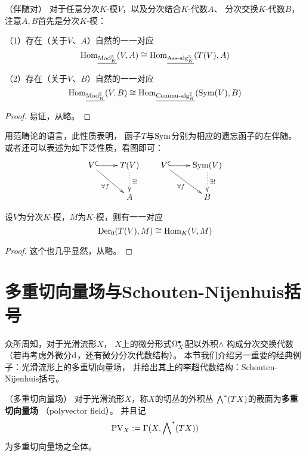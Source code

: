 \begin{prop}（伴随对）
对于任意分次$K$-模$V$，以及分次结合$K$-代数$A$、
分次交换$K$-代数$B$，注意$A,B$首先是分次$K$-模：

（1）存在（关于$V$、$A$）自然的一一对应
$$\operatorname{Hom}_{\underline{\operatorname{Mod}^{\mathbb{Z}}_{K}}}(V,A)\cong
\operatorname{Hom}_{\underline{\operatorname{Ass}\!\text{-}\!\operatorname{alg}^{\mathbb{Z}}_{K}}}(T(V),A)$$

（2）存在（关于$V$、$B$）自然的一一对应
$$\operatorname{Hom}_{\underline{\operatorname{Mod}^{\mathbb{Z}}_{K}}}(V,B)\cong
\operatorname{Hom}_{\underline{\operatorname{Commu}\!\text{-}\!\operatorname{alg}^{\mathbb{Z}}_{K}}}(\operatorname{Sym}(V),B)$$
\end{prop}
\begin{proof}
易证，从略。
\end{proof}
用范畴论的语言，此性质表明，
函子$T$与$\operatorname{Sym}$分别为相应的遗忘函子的左伴随。
或者还可以表述为如下泛性质，看图即可：
$$
  \xymatrix{
      V \ar@{^{(}->}[r]  \ar[rd]_{\forall f}
    & T(V)\ar@{.>}[d]^{\exists !}
  \\
    & A
  }
\quad\quad
  \xymatrix{
      V \ar@{^{(}->}[r]  \ar[rd]_{\forall f}
    & \Sym(V)\ar@{.>}[d]^{\exists !}
  \\
    & B
  }
$$

\begin{prop}%
设$V$为分次$K$-模，$M$为$K$-模，则有一一对应
$$\operatorname{Der}_0(T(V),M)\cong\operatorname{Hom}_K(V,M)$$
\end{prop}
\begin{proof}
这个也几乎显然，从略。
\end{proof}

\section{多重切向量场与Schouten-Nijenhuis括号}

众所周知，对于光滑流形$X$，
$X$上的微分形式$\Omega^{\bullet}_X$配以外积$\wedge$
构成分次交换代数（若再考虑外微分$\mathrm{d}$，还有微分分次代数结构）。
本节我们介绍另一重要的经典例子：光滑流形上的多重切向量场，
并给出其上的李超代数结构：Schouten-Nijenhuis括号。


\begin{definition}（多重切向量场）
对于光滑流形$X$，称$X$的切丛的外积丛
$\bigwedge\nolimits^{*}(TX)$的截面为\textbf{多重切向量场}
（polyvector field）。
并且记
$$\operatorname{PV}_X:=\Gamma(X,\bigwedge\nolimits^{*}(TX))$$
为多重切向量场之全体。
\end{definition}

